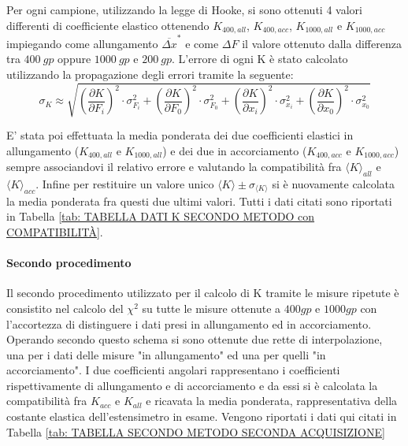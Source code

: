 \documentclass[a4paper,11pt,oneside]{article}
\begin{document}
Per ogni campione, utilizzando la legge di Hooke, si sono ottenuti 4 valori differenti di coefficiente elastico ottenendo $K_{400, all}$, $K_{400, acc}$, $K_{1000, all}$ e $K_{1000, acc}$ impiegando come  allungamento ${\overline{\Delta x}}^\ast$ e come $\Delta F$ il valore ottenuto dalla differenza tra $\SI{400}{gp}$ oppure $\SI{1000}{gp} $ e $ \SI{200}{gp}$. L'errore di ogni K è stato calcolato utilizzando la propagazione degli errori tramite la seguente:
\begin{equation*}
\sigma_K \approx \sqrt{\left ( \frac{\partial K }{\partial F_i} \right )^2 \cdot  \sigma_{ F_i}^2 +
\left (\frac{\partial K }{\partial F_0} \right )^2 \cdot  \sigma_{ F_0}^2 +
\left ( \frac{\partial K }{\partial x_i} \right )^2 \cdot  \sigma_{x_i}^2 +
\left ( \frac{\partial K }{\partial x_0} \right )^2\cdot  \sigma_{x_0} ^2 }

\end{equation*}

E' stata poi effettuata la media ponderata dei due coefficienti elastici in allungamento ($K_{400, all}$ e $K_{1000, all}$) e dei due in accorciamento ($K_{400, acc}$ e $K_{1000, acc}$) sempre associandovi il relativo errore e valutando la compatibilità fra ${\langle K \rangle}_{all}$ e ${\langle K \rangle}_{acc}$. Infine per restituire un valore unico $\langle K \rangle \pm \sigma_{\langle K \rangle}$ si è nuovamente calcolata la media ponderata fra questi due ultimi valori. Tutti i dati citati sono riportati in Tabella \ref{tab: TABELLA DATI K SECONDO METODO con COMPATIBILITÀ}.\\%

\paragraph{Secondo procedimento}
Il secondo procedimento utilizzato per il calcolo di K tramite le misure ripetute è consistito nel calcolo del $\chi^2$ su tutte le misure ottenute a $\SI{400}gp$ e $\SI{1000}gp$ con l'accortezza di distinguere i dati presi in allungamento ed in accorciamento. Operando secondo questo schema si sono ottenute due rette di interpolazione, una per i dati delle misure "in allungamento" ed una per quelli "in accorciamento". I due coefficienti angolari rappresentano i coefficienti rispettivamente di allungamento e di accorciamento e da essi si è calcolata la compatibilità fra ${K}_{acc}$ e ${K}_{all}$ e ricavata la media ponderata, rappresentativa della costante elastica dell'estensimetro in esame. Vengono riportati i dati qui citati in Tabella \ref{tab: TABELLA SECONDO METODO SECONDA ACQUISIZIONE}%
\end{document}
